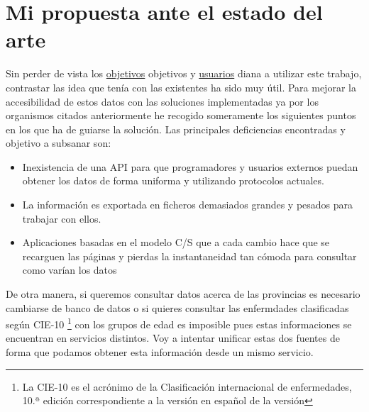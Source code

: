\section{Mi propuesta ante el estado del arte}
Sin perder de vista los \hyperref[sec:obj]{objetivos} objetivos y \hyperref[sec:usu]{usuarios} diana a utilizar este trabajo, contrastar las idea
que tenía con las existentes ha sido muy útil. Para mejorar la accesibilidad de estos datos con las soluciones implementadas 
ya por los organismos citados anteriormente he recogido someramente los siguientes puntos en los que ha de guiarse la 
solución. Las principales deficiencias encontradas y objetivo a subsanar son:
\begin{itemize}
    \item Inexistencia de una API para que programadores y usuarios externos puedan obtener los datos
    de forma uniforma y utilizando protocolos actuales.
    \item La información es exportada en ficheros demasiados grandes y pesados para trabajar con ellos.
    \item Aplicaciones basadas en el modelo C/S que a cada cambio hace que se recarguen las páginas y pierdas
    la instantaneidad tan cómoda para consultar como varían los datos
\end{itemize}

De otra manera, si queremos consultar datos acerca de las provincias es necesario cambiarse de banco de datos o si quieres
consultar las enfermdades clasificadas según CIE-10 \footnote{\cite{cie10}La CIE-10 es el acrónimo de la Clasificación internacional de enfermedades,
10.ª edición correspondiente a la versión en español de la versión} con los grupos de edad es imposible pues estas informaciones
se encuentran en servicios distintos. Voy a intentar unificar estas dos fuentes de forma que podamos obtener esta información
desde un mismo servicio.
